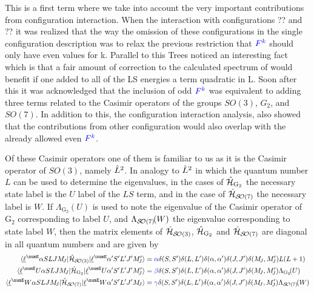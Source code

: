 \documentclass{article}
\begin{document}
This is a first term where we take into account the very important contributions from configuration interaction. When the interaction with configurations ?? and ?? it was realized that the way the omission of these configurations in the single configuration description was to relax the previous restriction that $\textcolor{blue}{{F^k}}$ should only have even values for k. Parallel to this Trees noticed an interesting fact which is that a fair amount of correction to the calculated spectrum of would benefit if one added to all of the LS energies a term quadratic in L. Soon after this it was acknowledged that the inclusion of odd $\textcolor{blue}{{F^k}}$ was equivalent to adding three terms related to the Casimir operators of the groups $SO(3)$, $G_2$, and $SO(7)$. In addition to this, the configuration interaction analysis, also showed that the contributions from other configuration would also overlap with the already allowed even $\textcolor{blue}{{F^k}}$.

Of these Casimir operators one of them is familiar to us as it is the Casimir operator of $SO(3)$, namely $\hat{L}^2$. In analogy to $\hat{L}^2$ in which the quantum number $L$ can be used to determine the eigenvalues, in the cases of $\hat{\mathcal{H}}_{\text{G}_2}$ the necessary state label is the $U$ label of the $LS$ term, and in the case of $\hat{\mathcal{H}}_{\mathcal{S\!O}(7)}$ the necessary label is $W$. If $\Lambda_{\text{G}_2}\!(U)$ is used to note the eigenvalue of the Casimir operator of $\text{G}_2$ corresponding to label $U$, and $\Lambda_{\mathcal{S\!O}(7)}\!(W)$ the eigenvalue corresponding to state label $W$, then the matrix elements of $\hat{\mathcal{H}}_{\mathcal{S\!O}(3)}$, $\hat{\mathcal{H}}_{\text{G}_2}$ and $\hat{\mathcal{H}}_{\mathcal{S\!O}(7)}$ are diagonal in all quantum numbers and are given by
\begin{align}
    \braopket{\lorb^\numE \alpha S L J \Msub{J}}
        {\hamTreesSymbol}
        {\lorb^\numE \alpha' S' L' J' \Msub{J}'} &=
        \casimirAlpha
        \kronecker{S}{S'}
        \kronecker{L}{L'}
        \kronecker{\alpha}{\alpha'}
        \kronecker{J}{J'}
        \kronecker{\Msub{J}}{\Msub{J}'}
        L(L+1) \\
    \braopket{\lorb^\numE U \alpha S L J \Msub{J}}
        {\hamGTwoSymbol}
        {\lorb^\numE U \alpha' S' L' J' \Msub{J}'} &=
        \casimirBeta
        \kronecker{S}{S'}
        \kronecker{L}{L'}
        \kronecker{\alpha}{\alpha'}
        \kronecker{J}{J'}
        \kronecker{\Msub{J}}{\Msub{J}'}
        \Lambda_{\text{G}_2}\!(U) \\
    \braopket{\lorb^\numE W \alpha S L J \Msub{J}}
        {\hamSOSevenSymbol}
        {\lorb^\numE W \alpha' S' L' J' \Msub{J}} &=
        \casimirGamma
        \kronecker{S}{S'}
        \kronecker{L}{L'}
        \kronecker{\alpha}{\alpha'}
        \kronecker{J}{J'}
        \kronecker{\Msub{J}}{\Msub{J}'}
        \Lambda_{\SO{7}}\!(W)
\end{align}
\end{document}
